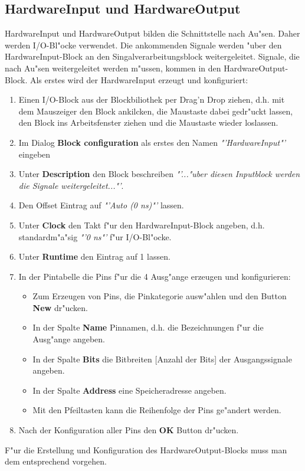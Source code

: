 \subsection{HardwareInput und HardwareOutput}
HardwareInput und HardwareOutput bilden die Schnittstelle nach Au"sen. Daher werden I/O-Bl"ocke verwendet. Die ankommenden Signale werden "uber den HardwareInput-Block an den Singalverarbeitungsblock weitergeleitet. Signale, die nach Au"sen weitergeleitet werden m"ussen, kommen in den HardwareOutput-Block. Als erstes wird der HardwareInput erzeugt und konfiguriert:
\begin{enumerate}
	\item Einen I/O-Block aus der Blockbiliothek per Drag'n Drop ziehen, d.h. mit dem Mauszeiger den Block ankilcken, die Maustaste dabei gedr"uckt lassen, den Block ins Arbeitsfenster ziehen und die Maustaste wieder loslassen.
	\item Im Dialog {\bf Block configuration} als erstes den Namen {\itshape "'HardwareInput"'} eingeben
	\item Unter {\bf Description} den Block beschreiben {\itshape "'..."uber diesen Inputblock werden die Signale weitergeleitet..."'}.
	\item Den Offset Eintrag auf {\itshape "'Auto (0 ns)"'} lassen.
	\item Unter {\bf Clock} den Takt f"ur den HardwareInput-Block angeben, d.h. standardm"a"sig {\itshape "'0 ns"'} f"ur I/O-Bl"ocke.
	\item Unter {\bf Runtime} den Eintrag auf 1 lassen.
	\item In der Pintabelle die Pins f"ur die 4 Ausg"ange erzeugen und konfigurieren:
		\begin{itemize}
			\item Zum Erzeugen von Pins, die Pinkategorie ausw"ahlen und den Button {\bf New} dr"ucken.
			\item In der Spalte {\bf Name} Pinnamen, d.h. die Bezeichnungen f"ur die Ausg"ange angeben.
			\item In der Spalte {\bf Bits} die Bitbreiten [Anzahl der Bits] der Ausgangssignale angeben.
			\item In der Spalte {\bf Address} eine Speicheradresse angeben.
			\item Mit den Pfeiltasten kann die Reihenfolge der Pins ge"andert werden.
		\end{itemize}
	\item Nach der Konfiguration aller Pins den {\bf OK} Button dr"ucken.
\end{enumerate}
F"ur die Erstellung und Konfiguration des HardwareOutput-Blocks muss man dem entsprechend vorgehen.

